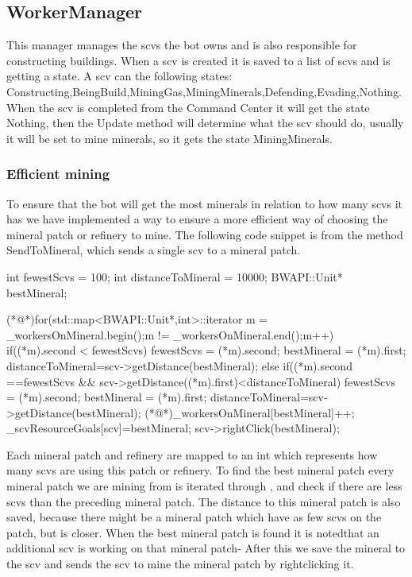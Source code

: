 	\subsection{WorkerManager}
		This manager manages the scvs the bot owns and is also responsible for constructing buildings. When a scv is created it is saved to a list of 
		scvs and is getting a state. A scv can the following states: Constructing,BeingBuild,MiningGas,MiningMinerals,Defending,Evading,Nothing. When 
		the scv is completed from the Command Center it will get the state Nothing, then the Update method will determine what the scv should do, usually 
		it will be set to mine minerals, so it gets the state MiningMinerals. 
		\subsubsection*{Efficient mining}
			To ensure that the bot will get the most minerals in relation to how many scvs it has we have implemented a way to ensure a more efficient 
			way of choosing the mineral patch or refinery to mine. The following code snippet is from the method SendToMineral, which sends a single scv 
			to a mineral patch.
			
				\begin{Sourcecode}[caption=SendToMineral method]
	int fewestScvs = 100;
	int distanceToMineral = 10000;
	BWAPI::Unit* bestMineral;

	(*@\lnote@*)for(std::map<BWAPI::Unit*,int>::iterator m = _workersOnMineral.begin();m != _workersOnMineral.end();m++)
	{
		if((*m).second < fewestScvs)
		{
			fewestScvs = (*m).second;
			bestMineral = (*m).first;
			distanceToMineral=scv->getDistance(bestMineral);
		}
		else if((*m).second ==fewestScvs && scv->getDistance((*m).first)<distanceToMineral)
		{
			fewestScvs = (*m).second;
			bestMineral = (*m).first;
			distanceToMineral=scv->getDistance(bestMineral);
		}
	}
	(*@\lnote@*)_workersOnMineral[bestMineral]++;
	_scvResourceGoals[scv]=bestMineral;
	scv->rightClick(bestMineral);
				\end{Sourcecode}
			Each mineral patch and refinery are mapped to an int which represents how many scvs are using this patch or refinery. To find the best mineral 
			patch every mineral patch we are mining from is iterated through , and check if there are less scvs than the preceding mineral patch. 
			The distance to this mineral patch is also saved, because there might be a mineral patch which have as few scvs on the patch, but is closer. 
			When the best mineral patch is found it is notedthat an additional scv is working on that mineral patch- After this we save the 
			mineral to the scv and sends the scv to mine the mineral patch by rightclicking it.
			
